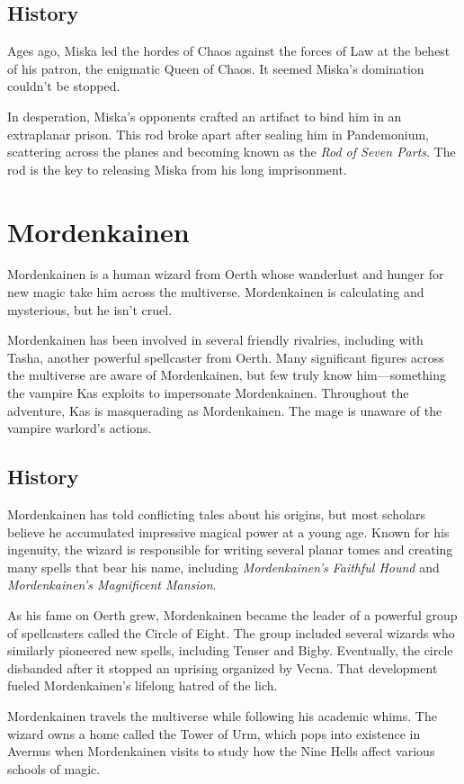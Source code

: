 \documentclass[10pt,a4paper,twoside,bg=print,twocolumn,openany,nodeprecatedcode]{dndbook}
\begin{document}
\subsection{History}
Ages ago, Miska led the hordes of Chaos against the forces of Law at the behest of his patron, the enigmatic Queen of Chaos. It seemed Miska's domination couldn't be stopped.

In desperation, Miska's opponents crafted an artifact to bind him in an extraplanar prison. This rod broke apart after sealing him in Pandemonium, scattering across the planes and becoming known as the \textit{Rod of Seven Parts}. The rod is the key to releasing Miska from his long imprisonment.

\section{Mordenkainen}
Mordenkainen is a human wizard from Oerth whose wanderlust and hunger for new magic take him across the multiverse. Mordenkainen is calculating and mysterious, but he isn't cruel.

Mordenkainen has been involved in several friendly rivalries, including with Tasha, another powerful spellcaster from Oerth. Many significant figures across the multiverse are aware of Mordenkainen, but few truly know him—something the vampire Kas exploits to impersonate Mordenkainen. Throughout the adventure, Kas is masquerading as Mordenkainen. The mage is unaware of the vampire warlord's actions.

\subsection{History}
Mordenkainen has told conflicting tales about his origins, but most scholars believe he accumulated impressive magical power at a young age. Known for his ingenuity, the wizard is responsible for writing several planar tomes and creating many spells that bear his name, including \textit{Mordenkainen's Faithful Hound} and \textit{Mordenkainen's Magnificent Mansion}.

As his fame on Oerth grew, Mordenkainen became the leader of a powerful group of spellcasters called the Circle of Eight. The group included several wizards who similarly pioneered new spells, including Tenser and Bigby. Eventually, the circle disbanded after it stopped an uprising organized by Vecna. That development fueled Mordenkainen's lifelong hatred of the lich.

Mordenkainen travels the multiverse while following his academic whims. The wizard owns a home called the Tower of Urm, which pops into existence in Avernus when Mordenkainen visits to study how the Nine Hells affect various schools of magic.
\end{document}

